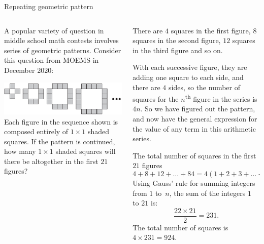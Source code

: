 \documentclass[9pt,aspectratio=169]{beamer}
\begin{document}
\begin{frame}{Repeating geometric pattern}
  \begin{columns}[T]
    \begin{column}{0.5\textwidth}
      A popular variety of question in middle school math contests involves series of geometric patterns.  Consider this question from MOEMS in December 2020:
      \begin{problem}
        \includegraphics[width=\textwidth]{06 - Arithmetic Sequences/moems.png}
        Each figure in the sequence shown is composed entirely of $1 \times 1$ shaded squares.  If the pattern is continued, how many $1 \times 1$ shaded squares will there be altogether in the first $21$ figures?
      \end{problem}
    \end{column}
    \begin{column}{0.5\textwidth}
      There are $4$ squares in the first figure, $8$ squares in the second figure, $12$ squares in the third figure and so on.

      With each successive figure, they are adding one square to each side, and there are $4$ sides, so the number of squares for the $n$\textsuperscript{th} figure in the series is $4n$.  So we have figured out the pattern, and now have the general expression for the value of any term in this arithmetic series.

      The total number of squares in the first $21$ figures
      \[ 4 + 8 + 12 + \ldots + 84 = 4 \left(1 + 2 + 3 + \ldots + 21\right). \]
      Using Gauss' rule for summing integers from $1$ 
      to~$n$, the sum of the integers $1$ to $21$ is:
      \[ \frac{22 \times 21}{2} = 231. \]
      The total number of squares is $4 \times 231 = 924.$

    \end{column}
  \end{columns}
\end{frame}
\end{document}
